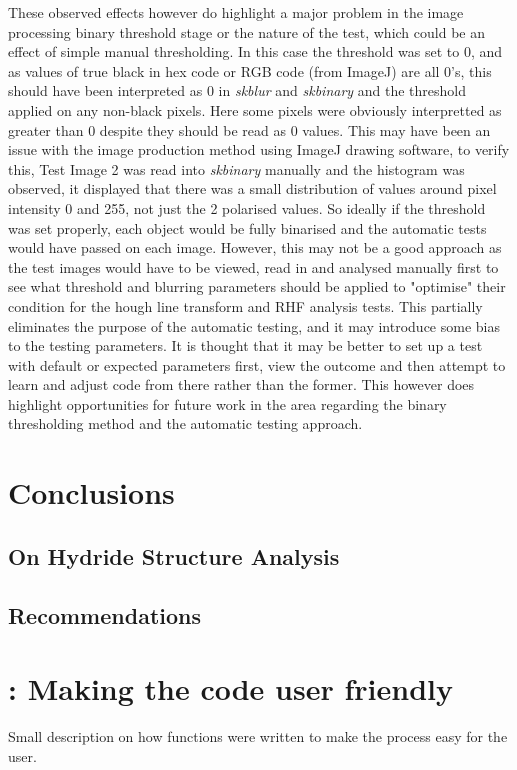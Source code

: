 \documentclass{article}
\begin{document}
These observed effects however do highlight a major problem in the image processing binary threshold stage or the nature of the test, which could be an effect of simple manual thresholding. In this case the threshold was set to 0, and as values of true black in hex code or RGB code (from ImageJ) are all 0's, this should have been interpreted as 0 in \textit{skblur} and \textit{skbinary} and the threshold applied on any non-black pixels. Here some pixels were obviously interpretted as greater than 0 despite they should be read as 0 values. This may have been an issue with the image production method using ImageJ drawing software, to verify this, Test Image 2 was read into \textit{skbinary} manually and the histogram was observed, it displayed that there was a small distribution of values around pixel intensity 0 and 255, not just the 2 polarised values. So ideally if the threshold was set properly, each object would be fully binarised and the automatic tests would have passed on each image. However, this may not be a good approach as the test images would have to be viewed, read in and analysed manually first to see what threshold and blurring parameters should be applied to "optimise" their condition for the hough line transform and RHF analysis tests. This partially eliminates the purpose of the automatic testing, and it may introduce some bias to the testing parameters. It is thought that it may be better to set up a test with default or expected parameters first, view the outcome and then attempt to learn and adjust code from there rather than the former. This however does highlight opportunities for future work in the area regarding the binary thresholding method and the automatic testing approach.



\section{Conclusions}
\subsection{On Hydride Structure Analysis}

\subsection{Recommendations}

\newpage



\newpage
\appendix
\section{: Making the code user friendly}
Small description on how functions were written to make the process easy for the user.
\end{document}

